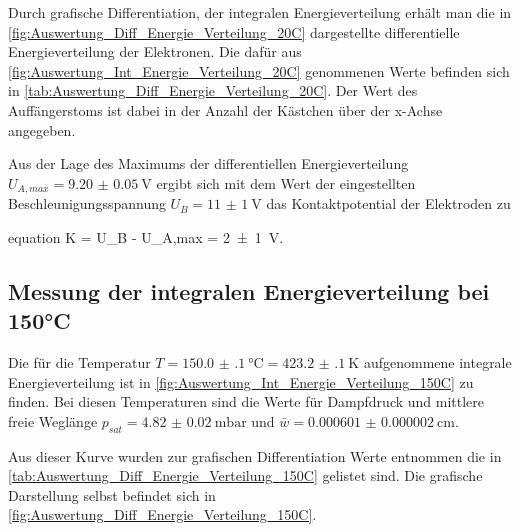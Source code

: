 	
	Durch grafische Differentiation, der integralen Energieverteilung erhält man die in
	\cref{fig:Auswertung_Diff_Energie_Verteilung_20C} dargestellte differentielle Energieverteilung
	der Elektronen. Die dafür aus \cref{fig:Auswertung_Int_Energie_Verteilung_20C} genommenen Werte
	befinden sich in \cref{tab:Auswertung_Diff_Energie_Verteilung_20C}. Der Wert des Auffängerstoms
	ist dabei in der Anzahl der Kästchen über der x-Achse angegeben. 
	
	
	
	
	Aus der Lage des Maximums der differentiellen Energieverteilung $U_{A,max} = \SI{9.20(5)}{\volt}$ 
	ergibt sich mit dem Wert der eingestellten Beschleunigungsspannung $U_{B} = \SI{11(1)}{\volt}$ das
	Kontaktpotential der Elektroden zu 
	\begin{empheq}{equation}
			K = U_{B} - U_{A,max} = \SI{2(1)}{\volt}.  
		    \label{val:Auswertung_K_1}
	\end{empheq}
	
			
\subsection{Messung der integralen Energieverteilung bei 150°C}
	
	Die für die Temperatur $T =\SI{150.0(1)}{\degreeCelsius} = \SI{423.2(1)}{\kelvin}$
	aufgenommene integrale Energieverteilung ist in \cref{fig:Auswertung_Int_Energie_Verteilung_150C}
	zu finden. Bei diesen Temperaturen sind die Werte für Dampfdruck und mittlere freie Weglänge
	$p_{sat} = \SI{4.82(2)}{\milli\bar}$ und $\bar{w} = \SI{0.000601(2)}{\cm}$. 
	
	
	Aus dieser Kurve wurden zur grafischen Differentiation Werte entnommen die in \cref{tab:Auswertung_Diff_Energie_Verteilung_150C} gelistet sind. Die grafische
	Darstellung selbst befindet sich in \cref{fig:Auswertung_Diff_Energie_Verteilung_150C}.
	
